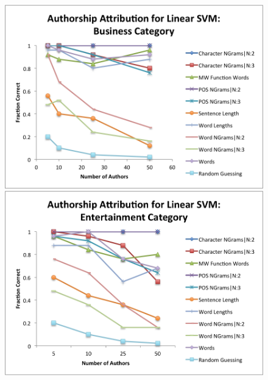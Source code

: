 \documentclass[pageno]{jpaper}
\begin{document}
\begin{figure}[h!]
\begin{center}
\includegraphics*[scale=.75]{SVMBusiness}
\includegraphics*[scale=.75]{SVMEntertainment}
\end{center}
\label{fig:SVMCategories1}
\end{figure}
\end{document}
